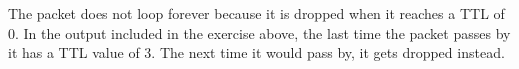 The packet does not loop forever because it is dropped when it reaches a TTL of 0. In the output included in the exercise above, the last time the packet passes by it has a TTL value of 3. The next time it would pass by, it gets dropped instead.